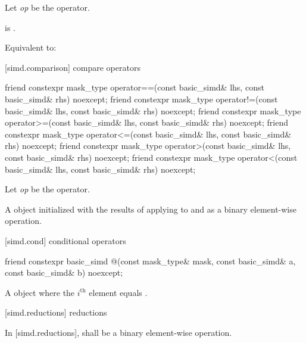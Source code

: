 \begin{itemdescr}
  \pnum Let \textit{op} be the operator.

  \pnum\constraints
   is .

  \pnum\effects
  Equivalent to: 
\end{itemdescr}

[simd.comparison]{ compare operators}

\begin{itemdecl}
friend constexpr mask_type operator==(const basic_simd& lhs, const basic_simd& rhs) noexcept;
friend constexpr mask_type operator!=(const basic_simd& lhs, const basic_simd& rhs) noexcept;
friend constexpr mask_type operator>=(const basic_simd& lhs, const basic_simd& rhs) noexcept;
friend constexpr mask_type operator<=(const basic_simd& lhs, const basic_simd& rhs) noexcept;
friend constexpr mask_type operator>(const basic_simd& lhs, const basic_simd& rhs) noexcept;
friend constexpr mask_type operator<(const basic_simd& lhs, const basic_simd& rhs) noexcept;
\end{itemdecl}

\begin{itemdescr}
  \pnum Let \textit{op} be the operator.

  \pnum\ConstraintOperatorTWellFormed

  \pnum\returns
  A  object initialized with the results of applying \op{} to  and  as a binary element-wise operation.
\end{itemdescr}

[simd.cond]{ conditional operators}

\begin{itemdecl}
friend constexpr basic_simd
@\simdselect@(const mask_type& mask, const basic_simd& a, const basic_simd& b) noexcept;
\end{itemdecl}

\begin{itemdescr}
  \pnum\returns
  A  object where the $i^\text{th}$ element equals  \foralli.
\end{itemdescr}

[simd.reductions]{ reductions}

\pnum
In [simd.reductions],  shall be a binary element-wise operation.

